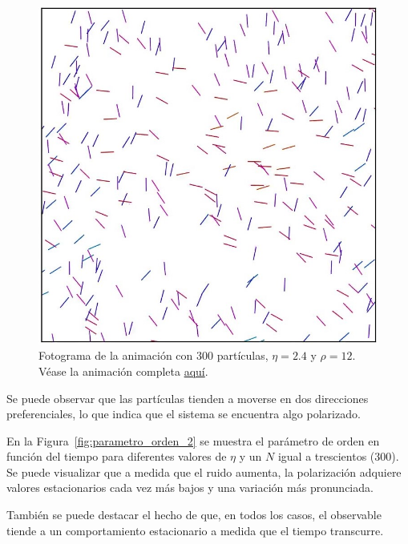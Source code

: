 \documentclass[11pt, a4paper]{article}
\begin{document}
            \begin{figure}[H]
                \centering
                \includegraphics[width=\textwidth]{./animation-n300-eta2p4-frame}
                \caption{Fotograma de la animación con 300 partículas, $\eta = 2.4$ y $\rho = 12$.\\Véase la animación completa \href{https://youtu.be/aZ9eOtlXgQw}{aquí}.}
                \label{fig:parametro_orden_1}
            \end{figure}

            Se puede observar que las partículas tienden a moverse en dos direcciones preferenciales, lo que indica que
            el sistema se encuentra algo polarizado.

            En la Figura~\ref{fig:parametro_orden_2} se muestra el parámetro de orden en función del tiempo para diferentes valores de $\eta$
            y un $N$ igual a trescientos (300).
            Se puede visualizar que a medida que el ruido aumenta, la polarización adquiere valores estacionarios cada
            vez más bajos y una variación más pronunciada.

            También se puede destacar el hecho de que, en todos los casos, el observable tiende a un comportamiento
            estacionario a medida que el tiempo transcurre.
\end{document}
